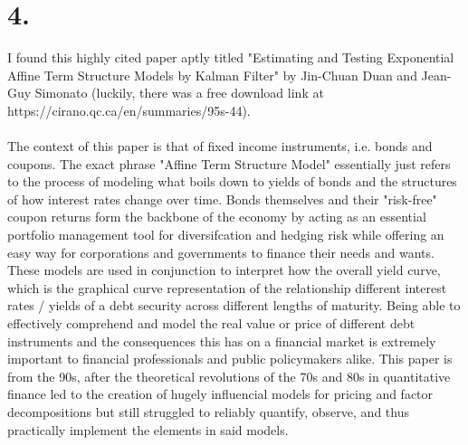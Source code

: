 \documentclass{article}
\begin{document}
{\Large 

\section*{4.}

I found this highly cited paper aptly titled "Estimating and Testing Exponential Affine Term Structure Models by Kalman Filter" by Jin-Chuan Duan and Jean-Guy Simonato (luckily, there was a free download link at https://cirano.qc.ca/en/summaries/95s-44). \\ \\
The context of this paper is that of fixed income instruments, i.e. bonds and coupons. The exact phrase "Affine Term Structure Model" essentially just refers to the process of modeling what boils down to yields of bonds and the structures of how interest rates change over time. Bonds themselves and their "risk-free" coupon returns form the backbone of the economy by acting as an essential portfolio management tool for diversifcation and hedging risk while offering an easy way for corporations and governments to finance their needs and wants. These models are used in conjunction to interpret how the overall yield curve, which is the graphical curve representation of the relationship different interest rates / yields of a debt security across different lengths of maturity. Being able to effectively comprehend and model the real value or price of different debt instruments and the consequences this has on a financial market is extremely important to financial professionals and public policymakers alike. This paper is from the 90s, after the theoretical revolutions of the 70s and 80s in quantitative finance led to the creation of hugely influencial models for pricing and factor decompositions but still struggled to reliably quantify, observe, and thus practically implement the elements in said models. \\ \\
}
\end{document}
